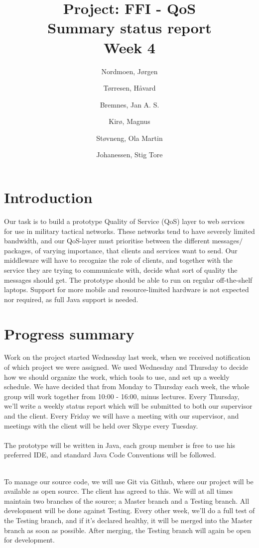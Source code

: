 \documentclass[titlepage]{article}
\title{Project: FFI - QoS \\ Summary status report \\ Week 4}
\author{Nordmoen, Jørgen \and Tørresen, Håvard \and Bremnes, Jan A. S.  \and Kirø, Magnus  \and Støvneng, Ola Martin  \and Johanessen, Stig Tore}
\begin{document}
    \maketitle
    \newpage
      
    \section*{Introduction}
        Our task is to build a prototype Quality of Service (QoS) layer to web services for use in military tactical networks. These networks tend to have severely limited bandwidth, and our QoS-layer must prioritise between the different messages$/$packages, of varying importance, that clients and services want to send. Our middleware will have to recognize the role of clients, and together with the service they are trying to communicate with, decide what sort of quality the messages should get.
The prototype should be able to run on regular off-the-shelf laptops. Support for more mobile and resource-limited hardware is not expected nor required, as full Java support is needed.

    \section*{Progress summary}
        Work on the project started Wednesday last week, when we received notification of which project we were assigned. We used Wednesday and Thursday to decide how we should organize the work, which tools to use, and set up a weekly schedule.
We have decided that from Monday to Thursday each week, the whole group will work together from 10:00 - 16:00, minus lectures. Every Thursday, we'll write a weekly status report which will be submitted to both our supervisor and the client. Every Friday we will have a meeting with our supervisor, and meetings with the client will be held over Skype every Tuesday.
\\\\
        The prototype will be written in Java, each group member is free to use his preferred IDE, and standard Java Code Conventions will be followed. 

\\To manage our source code, we will use Git via Github, where our project will be available as open source. The client has agreed to this. We will at all times maintain two branches of the source; a Master branch and a Testing branch. All development will be done against Testing. Every other week, we'll do a full test of the Testing branch, and if it's declared healthy, it will be merged into the Master branch as soon as possible. After merging, the Testing branch will again be open for development.
\end{document}
